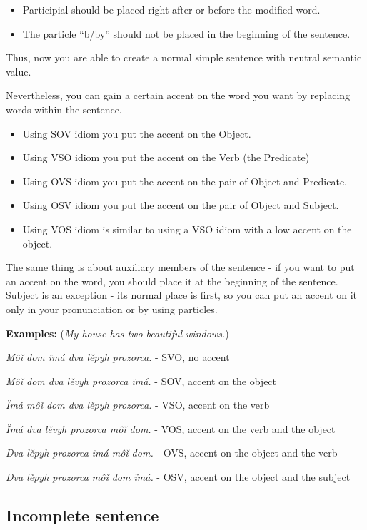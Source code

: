 \begin{itemize}
	\item Participial should be placed right after or before the modified word.
	\item The particle “b/by” should not be placed in the beginning of the sentence.
\end{itemize}

Thus, now you are able to create a normal simple sentence with neutral semantic value.

Nevertheless, you can gain a certain accent on the word you want by replacing words within the sentence.

\begin{itemize}
	\item Using SOV idiom you put the accent on the Object.
	\item Using VSO idiom you put the accent on the Verb (the Predicate)
	\item Using OVS idiom you put the accent on the pair of Object and Predicate.
	\item Using OSV idiom you put the accent on the pair of Object and Subject.
	\item Using VOS idiom is similar to using a VSO idiom with a low accent on the object.
\end{itemize}

The same thing is about auxiliary members of the sentence - if you want to put an accent on the word, you should place it at the beginning of the sentence. Subject is an exception - its normal place is first, so you can put an accent on it only in your pronunciation or by using particles.

\textbf{Examples:} (\textit{My house has two beautiful windows.})

\textit{Môǐ dom ïmá dva lěpyh prozorca.} - SVO, no accent

\textit{Môǐ dom dva lěvyh prozorca ïmá.} - SOV, accent on the object

\textit{Ïmá môǐ dom dva lěpyh prozorca.} - VSO, accent on the verb

\textit{Ïmá dva lěvyh prozorca môǐ dom.} - VOS, accent on the verb and the object

\textit{Dva lěpyh prozorca ïmá môǐ dom.} - OVS, accent on the object and the verb

\textit{Dva lěpyh prozorca môǐ dom ïmá.} - OSV, accent on the object and the subject

\subsection{Incomplete sentence}

